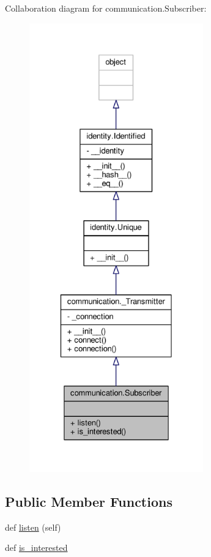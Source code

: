 Collaboration diagram for communication.\+Subscriber\+:\nopagebreak
\begin{figure}[H]
\begin{center}
\leavevmode
\includegraphics[height=550pt]{classcommunication_1_1Subscriber__coll__graph}
\end{center}
\end{figure}
\subsection*{Public Member Functions}
\begin{DoxyCompactItemize}
\item 
def \hyperlink{classcommunication_1_1Subscriber_a9c46d95ba346a8d95da29088fc130f93}{listen} (self)
\item 
def \hyperlink{classcommunication_1_1Subscriber_a905bfacee791a84b2d5bb39059c684d5}{is\+\_\+interested}
\end{DoxyCompactItemize}


